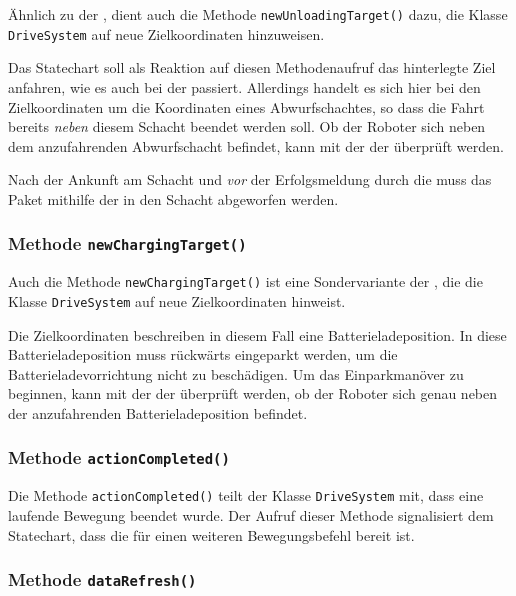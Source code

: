 Ähnlich zu der , dient auch die Methode \texttt{newUnloadingTarget()} dazu, die Klasse \texttt{DriveSystem} auf neue Zielkoordinaten hinzuweisen.

Das Statechart soll als Reaktion auf diesen Methodenaufruf das hinterlegte Ziel anfahren, wie es auch bei der  passiert.
Allerdings handelt es sich hier bei den Zielkoordinaten um die Koordinaten eines Abwurfschachtes, so dass die Fahrt bereits \emph{neben} diesem Schacht beendet werden soll. 
Ob der Roboter sich neben dem anzufahrenden Abwurfschacht befindet, kann mit der  der  überprüft werden.

Nach der Ankunft am Schacht und \emph{vor} der Erfolgsmeldung durch die  muss das Paket mithilfe der  in den Schacht abgeworfen werden.


\subsubsection{Methode \texttt{newChargingTarget()}}
\label{method:chargingtarget}

Auch die Methode \texttt{newChargingTarget()} ist eine Sondervariante der , die die Klasse \texttt{DriveSystem} auf neue Zielkoordinaten hinweist.

Die Zielkoordinaten beschreiben in diesem Fall eine Batterieladeposition. 
In diese Batterieladeposition muss rückwärts eingeparkt werden, um die Batterieladevorrichtung nicht zu beschädigen. 
Um das Einparkmanöver zu beginnen, kann mit der  der  überprüft werden, ob der Roboter sich genau neben der anzufahrenden Batterieladeposition befindet.


\subsubsection{Methode \texttt{actionCompleted()}}
\label{method:completed}

Die Methode \texttt{actionCompleted()} teilt der Klasse \texttt{DriveSystem} mit, dass eine laufende Bewegung beendet wurde.
Der Aufruf dieser Methode signalisiert dem Statechart, dass die  für einen weiteren Bewegungsbefehl bereit ist.


\subsubsection{Methode \texttt{dataRefresh()}}
\label{method:refresh}

